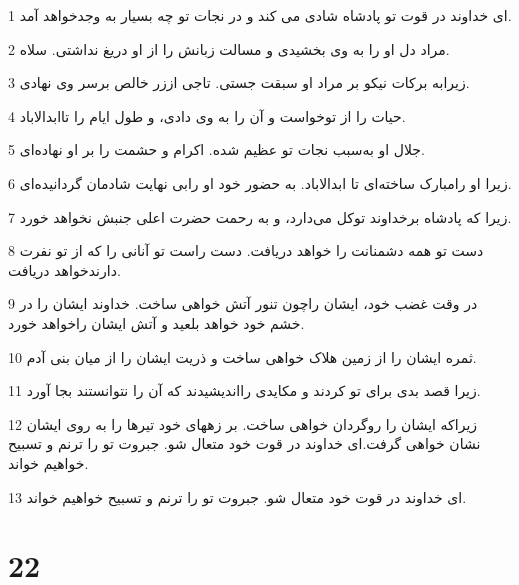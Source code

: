 \par 1 ای خداوند در قوت تو پادشاه شادی می کند و در نجات تو چه بسیار به وجدخواهد آمد.
\par 2 مراد دل او را به وی بخشیدی و مسالت زبانش را از او دریغ نداشتی. سلاه.
\par 3 زیرابه برکات نیکو بر مراد او سبقت جستی. تاجی اززر خالص برسر وی نهادی.
\par 4 حیات را از توخواست و آن را به وی دادی، و طول ایام را تاابدالاباد.
\par 5 جلال او به‌سبب نجات تو عظیم شده. اکرام و حشمت را بر او نهاده‌ای.
\par 6 زیرا او رامبارک ساخته‌ای تا ابدالاباد. به حضور خود او رابی نهایت شادمان گردانیده‌ای.
\par 7 زیرا که پادشاه برخداوند توکل می‌دارد، و به رحمت حضرت اعلی جنبش نخواهد خورد.
\par 8 دست تو همه دشمنانت را خواهد دریافت. دست راست تو آنانی را که از تو نفرت دارندخواهد دریافت.
\par 9 در وقت غضب خود، ایشان راچون تنور آتش خواهی ساخت. خداوند ایشان را در خشم خود خواهد بلعید و آتش ایشان راخواهد خورد.
\par 10 ثمره ایشان را از زمین هلاک خواهی ساخت و ذریت ایشان را از میان بنی آدم.
\par 11 زیرا قصد بدی برای تو کردند و مکایدی رااندیشیدند که آن را نتوانستند بجا آورد.
\par 12 زیراکه ایشان را روگردان خواهی ساخت. بر زههای خود تیرها را به روی ایشان نشان خواهی گرفت.‌ای خداوند در قوت خود متعال شو. جبروت تو را ترنم و تسبیح خواهیم خواند.
\par 13 ‌ای خداوند در قوت خود متعال شو. جبروت تو را ترنم و تسبیح خواهیم خواند.
 
\chapter{22}

